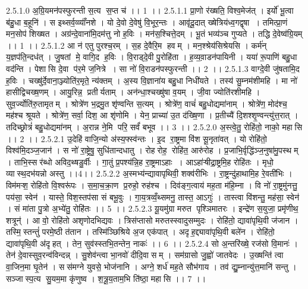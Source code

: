 2.5.1.0
अ॒ग्रि॒यमन॑पस्फुरन्ती स॒त्य स॒प्त च॑ ।। 1 ।।
2.5.1.1
प्रा॒णो र॑ख्षति॒ विश्व॒मेज॑त् । इर्यो॑ भू॒त्वा ब॑हु॒धा ब॒हूनि॑ । स इथ्सर्व॒व्व्याँ॑नशे । यो दे॒वो दे॒वेषु॑ वि॒भूर॒न्तः । आवृ॑दू॒दात् ख्षेत्रिय॑ध्व॒गद्वृषा । तमित्प्रा॒णं मन॒सोप॑ शिख्षत । अग्र॑न्दे॒वाना॑मि॒दम॑त्तु नो ह॒विः । मन॑स॒श्चित्ते॒दम् । भू॒तं भव्य॑ञ्च गुप्यते । तद्धि दे॒वेष्व॑ग्रि॒यम् ।। 1 ।।
2.5.1.2
आ न॑ एतु पुरश्च॒रम् । स॒ह दे॒वैरि॒म हवम् । मन॒श्श्रेय॑सिश्रेयसि । कर्म॑न् य॒ज्ञप॑ति॒न्दध॑त् । जु॒षतां मे॒ वागि॒द ह॒विः । वि॒राड्दे॒वी पु॒रोहि॑ता । ह॒व्य॒वा़डन॑पायिनी । यया॑ रू॒पाणि॑ बहु॒धा वद॑न्ति । पेशा॑सि दे॒वा प॑र॒मे ज॒नित्रे । सा नो॑ वि॒राडन॑पस्फुरन्ती ।। 2 ।।
2.5.1.3
वाग्दे॒वी जु॑षतामि॒द ह॒विः । चख्षु॑र्दे॒वाना॒ञ्ज्योति॑र॒मृते॒ न्य॑क्तम् । अ॒स्य वि॒ज्ञाना॑य बहु॒धा निधी॑यते । तस्य॑ सु॒म्नम॑शीमहि । मा नो॑ हासीद्विचख्ष॒णम् । आयु॒रिन्न॒ प्रतीर्यताम् । अन॑न्धा॒श्चख्षु॑षा व॒यम् । जी॒वा ज्योति॑रशीमहि । सुव॒र्ज्योति॑रु॒तामृतम् । श्रोत्रे॑ण भ॒द्रमु॒त शृ॑ण्वन्ति स॒त्यम् । श्रोत्रे॑ण॒ वाचं॑ बहु॒धोद्यमा॑नाम् । श्रोत्रे॑ण॒ मोद॑श्च॒ मह॑श्च श्रूयते । श्रोत्रे॑ण॒ सर्वा॒ दिश॒ आ शृ॑णोमि । येन॒ प्राच्या॑ उ॒त द॑ख्षि॒णा । प्र॒तीच्यै॑ दि॒शश्शृ॒ण्वन्त्यु॑त्त॒रात् । तदिच्छ्रोत्रं॑ बहु॒धोद्यमा॑नम् । अ॒रान्न ने॒मि परि॒ सर्वं॑ बभूव ।। 3 ।।
2.5.2.0
अ॒स्त्वे॒तु॒ रोहि॑तो॒ नाको॒ महा॑सि ।। 2 ।।
2.5.2.1
उ॒देहि॑ वाजि॒न्यो अ॑स्य॒फ्स्व॑न्तः । इ॒द रा॒ष्ट्रमा वि॑श सू॒नृता॑वत् । यो रोहि॑तो॒ विश्व॑मि॒दञ्ज॒जान॑ । स नो॑ रा॒ष्ट्रेषु॒ सुधि॑तान्दधातु । रोह॑रोह॒॒ रोहि॑त॒ आरु॑रोह । प्र॒जाभि॒र्वृद्धि॑ञ्ज॒नुषा॑मु॒पस्थम् । ताभि॒स्सर॑ब्धो अविद॒थ्षडु॒र्वीः । गा॒तुं प्र॒पश्य॑न्नि॒ह रा॒ष्ट्रमाऽहाः । आऽहा॑ऱ्षीद्रा॒ष्ट्रमि॒ह रोहि॑तः । मृधो॒ व्यास्थ॒दभ॑यन्नो अस्तु ।।4।।
2.5.2.2
अ॒स्मभ्य॑न्द्यावापृथिवी॒ शक्व॑रीभिः । रा॒ष्ट्रन्दु॑हाथामि॒ह रे॒वती॑भिः । विम॑मऱ्श॒ रोहि॑तो वि॒श्वरू॑पः । स॒मा॒च॒क्रा॒ण प्र॒रुहो॒ रुह॑श्च । दिव॑ङ्ग॒त्वाय॑ मह॒ता म॑हि॒म्ना । वि नो॑ रा॒ष्ट्रमु॑नत्तु॒ पय॑सा॒ स्वेन॑ । यास्ते॒ विश॒स्तप॑सा सं बभू॒वुः । गा॒य॒त्रव्वँ॒थ्समनु॒ तास्त॒ आऽगुः॑ । तास्त्वा वि॑शन्तु॒ मह॑सा॒ स्वेन॑ । सं मा॑ता पु॒त्रो अ॒भ्ये॑तु॒ रोहि॑तः ।। 5 ।।
2.5.2.3
यू॒यमु॑ग्रा मरुत पृश्ञिमातरः । इन्द्रे॑ण स॒युजा॒ प्रमृ॑णीथ॒ शत्रून्॑ । आ वो॒ रोहि॑तो अशृणोदभिद्यवः । त्रिस॑प्तासो मरुतस्स्वादुसम्मुदः । रोहि॑तो॒ द्यावा॑पृथि॒वी ज॑जान । तस्मि॒॒स्तन्तुं॑ परमे॒ष्ठी त॑तान । तस्मि॑ञ्छिश्रिये अ॒ज एक॑पात् । अदृ॑ह॒द्द्यावा॑पृथि॒वी बले॑न । रोहि॑तो॒ द्यावा॑पृथि॒वी अ॑दृहत् । तेन॒ सुव॑स्स्तभि॒तन्तेन॒ नाकः॑ ।। 6 ।।
2.5.2.4
सो अ॒न्तरि॑ख्षे॒ रज॑सो वि॒मानः॑ । तेन॑ दे॒वास्सुव॒रन्व॑विन्दन्न् । सु॒शेव॑न्त्वा भा॒नवो॑ दीदि॒वासम् । सम॑ग्रासो जु॒ह्वो॑ जातवेदः । उ॒ख्षन्ति॑ त्वा वा॒जिन॒मा घृ॒तेन॑ । सस॑मग्ने युवसे॒ भोज॑नानि । अग्ने॒ शर्ध॑ मह॒ते सौभ॑गाय । तव॑ द्यु॒म्नान्यु॑त्त॒मानि॑ सन्तु । सञ्जास्प॒त्य सु॒यम॒मा कृ॑णुष्व । श॒त्रू॒य॒ताम॒भि ति॑ष्ठा॒ महा॑सि ।। 7 ।।
